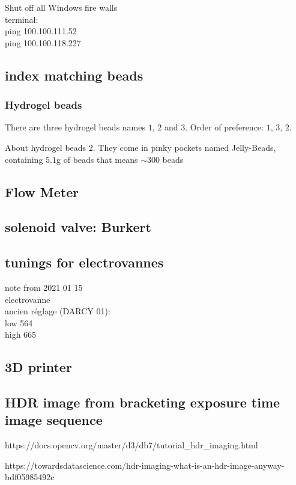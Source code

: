 \documentclass[twocolumn,amsmath,amssymb,floatfix]{revtex4}
\begin{document}
Shut off all Windows fire walls\\
terminal:\\
ping 100.100.111.52\\
ping 100.100.118.227\\

\subsection{index matching beads}
\subsubsection{Hydrogel beads}
There are three hydrogel beads names $1$, $2$ and $3$.
Order of preference: $1$, $3$, $2$.

About hydrogel beads $2$. They come in pinky pockets named Jelly-Beads, containing $5.1$g of beads that means $\sim300$ beads
\subsection{Flow Meter}

\subsection{solenoid valve: Burkert}

\subsection{tunings for electrovannes}

note from 2021 01 15\\
electrovanne\\
ancien réglage (DARCY 01):\\
low  564 \\
high 665\\


\subsection{3D printer}

\subsection{HDR image from bracketing exposure time image sequence}

https://docs.opencv.org/master/d3/db7/tutorial_hdr_imaging.html

https://towardsdatascience.com/hdr-imaging-what-is-an-hdr-image-anyway-bdf05985492c
\end{document}
